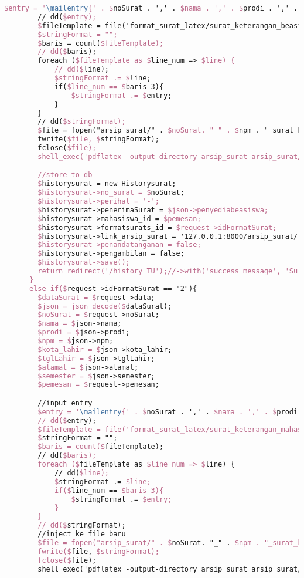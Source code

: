 \begin{lstlisting}[language=tex,basicstyle=\tiny,caption=HistorysuratController.php]
        $entry = '\mailentry{' . $noSurat . ',' . $nama . ',' . $prodi . ',' . $npm . ',' . $semester . ',' . $thnAkademik . ',' . $penyediabeasiswa . '}';
        // dd($entry);
        $fileTemplate = file('format_surat_latex/surat_keterangan_beasiswa.tex');
        $stringFormat = "";
        $baris = count($fileTemplate);
        // dd($baris);
        foreach ($fileTemplate as $line_num => $line) {
            // dd($line);
            $stringFormat .= $line;
            if($line_num == $baris-3){
                $stringFormat .= $entry;
            }
        }
        // dd($stringFormat);
        $file = fopen("arsip_surat/" . $noSurat. "_" . $npm . "_surat_keterangan_beasiswa.tex", "w");
        fwrite($file, $stringFormat);
        fclose($file);
        shell_exec('pdflatex -output-directory arsip_surat arsip_surat/' . $noSurat. '_' . $npm . '_surat_keterangan_beasiswa.tex');

        //store to db
        $historysurat = new Historysurat;
        $historysurat->no_surat = $noSurat;
        $historysurat->perihal = '-';
        $historysurat->penerimaSurat = $json->penyediabeasiswa;
        $historysurat->mahasiswa_id = $pemesan;
        $historysurat->formatsurats_id = $request->idFormatSurat;
        $historysurat->link_arsip_surat = '127.0.0.1:8000/arsip_surat/' . $noSurat. '_' . $npm . '_surat_keterangan_beasiswa.pdf';
        $historysurat->penandatanganan = false;
        $historysurat->pengambilan = false;
        $historysurat->save();
        return redirect('/history_TU');//->with('success_message', 'Surat berhasil dibuat!');
      }
      else if($request->idFormatSurat == "2"){
        $dataSurat = $request->data;
        $json = json_decode($dataSurat);
        $noSurat = $request->noSurat;
        $nama = $json->nama;
        $prodi = $json->prodi;
        $npm = $json->npm;
        $kota_lahir = $json->kota_lahir;
        $tglLahir = $json->tglLahir;
        $alamat = $json->alamat;
        $semester = $json->semester;
        $pemesan = $request->pemesan;

        //input entry
        $entry = '\mailentry{' . $noSurat . ',' . $nama . ',' . $prodi . ',' . $npm . ',' . $kota_lahir . ',' . $tglLahir . ',' . $alamat . ',' . $semester . '}';
        // dd($entry);
        $fileTemplate = file('format_surat_latex/surat_keterangan_mahasiswa_aktif.tex');
        $stringFormat = "";
        $baris = count($fileTemplate);
        // dd($baris);
        foreach ($fileTemplate as $line_num => $line) {
            // dd($line);
            $stringFormat .= $line;
            if($line_num == $baris-3){
                $stringFormat .= $entry;
            }
        }
        // dd($stringFormat);
        //inject ke file baru
        $file = fopen("arsip_surat/" . $noSurat. "_" . $npm . "_surat_keterangan_mahasiswa_aktif.tex", "w");
        fwrite($file, $stringFormat);
        fclose($file);
        shell_exec('pdflatex -output-directory arsip_surat arsip_surat/' . $noSurat . '_' . $npm . '_surat_keterangan_mahasiswa_aktif.tex');


\end{lstlisting}
